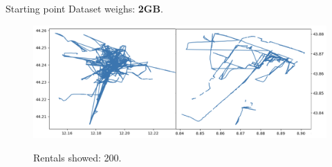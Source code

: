 \documentclass{beamer}
\begin{document}
\begin{frame}{Starting point}
Dataset weighs: \textbf{2GB}.
\begin{figure}[bt]
	\centering
	\includegraphics[width=\textwidth]{starting-point}
	\label{fig:starting-point}
	\caption{Rentals showed: 200.}
\end{figure}
\end{frame}
\end{document}
